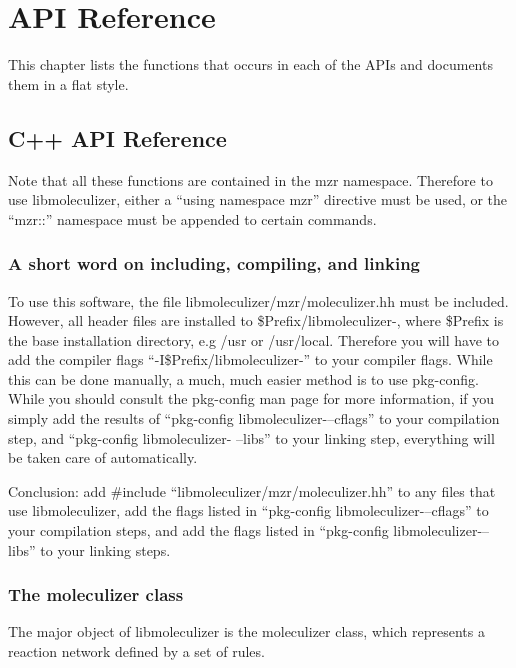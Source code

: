 \chapter {API Reference}
\label{chap:apiReference}

This chapter lists the functions that occurs in each of the APIs and
documents them in a flat style.

\section{C++ API Reference}

Note that all these functions are contained in the mzr namespace.
Therefore to use libmoleculizer, either a ``using namespace mzr''
directive must be used, or the ``mzr::'' namespace must be appended to
certain commands.  

\subsection{A short word on including, compiling, and linking}
To use this software, the file libmoleculizer/mzr/moleculizer.hh must
be included.  However, all header files are installed to
\${Prefix}/libmoleculizer-\currentversion, where \${Prefix} is the
base installation directory, e.g /usr or /usr/local.  Therefore you will have to
add the compiler flags ``-I\${Prefix}/libmoleculizer-\currentversion''
to your compiler flags.  While this can be done manually, a much, much
easier method is to use pkg-config.  While you should consult the
pkg-config man page for more information, if you simply add the
results of ``pkg-config libmoleculizer-\currentversion --cflags'' to
your compilation step, and ``pkg-config libmoleculizer-\currentversion
--libs'' to your linking step, everything will be taken care of
automatically.  


Conclusion: add #include ``libmoleculizer/mzr/moleculizer.hh'' to any
files that use libmoleculizer, add the flags listed in ``pkg-config
libmoleculizer-\currentversion --cflags'' to your compilation steps,
and add the flags listed in ``pkg-config
libmoleculizer-\currentversion --libs'' to your linking steps.  

\subsection{The moleculizer class}
The major object of libmoleculizer is the moleculizer class, which
represents a reaction network defined by a set of rules.  

